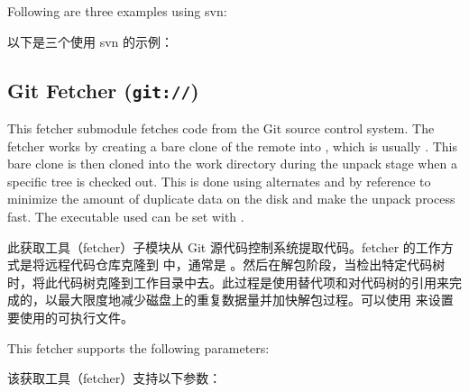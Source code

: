 \medskip
Following are three examples using svn:

以下是三个使用 svn 的示例：


\subsection{Git Fetcher (\texttt{git://})}
\label{section:Git Fetcher}

This fetcher submodule fetches code from the Git source control system. The fetcher works by creating a bare clone of the remote into , which is usually . This bare clone is then cloned into the work directory during the unpack stage when a specific tree is checked out. This is done using alternates and by reference to minimize the amount of duplicate data on the disk and make the unpack process fast. The executable used can be set with .

此获取工具（fetcher）子模块从 Git 源代码控制系统提取代码。fetcher 的工作方式是将远程代码仓库克隆到  中，通常是 。然后在解包阶段，当检出特定代码树时，将此代码树克隆到工作目录中去。此过程是使用替代项和对代码树的引用来完成的，以最大限度地减少磁盘上的重复数据量并加快解包过程。可以使用  来设置要使用的可执行文件。

This fetcher supports the following parameters:

该获取工具（fetcher）支持以下参数：


